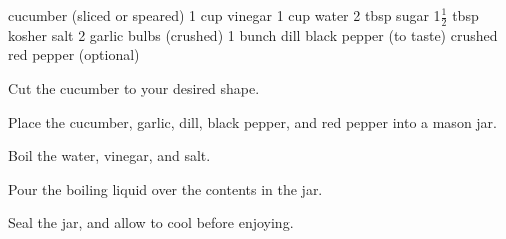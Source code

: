 \dishtype{\pickle}
\dishother{\vegetarian}
\begin{ingreds}
    cucumber (sliced or speared)
    1 cup vinegar
    1 cup water
    2 tbsp sugar
    1$\frac{1}{2}$ tbsp kosher salt
    2 garlic bulbs (crushed)
    1 bunch dill
    black pepper (to taste)
    crushed red pepper (optional)
\end{ingreds}
\begin{method}
    Cut the cucumber to your desired shape.\par
    Place the cucumber, garlic, dill, black pepper, and red pepper into a mason jar.\par
    Boil the water, vinegar, and salt.\par
    Pour the boiling liquid over the contents in the jar.\par
    Seal the jar, and allow to cool before enjoying.
\end{method}